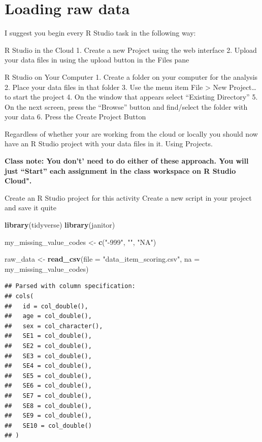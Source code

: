 \documentclass[
]{krantz}
\makeatletter
\newenvironment{Shaded}{\begin{snugshade}}{\end{snugshade}}
\newcommand{\DataTypeTok}[1]{\textcolor[rgb]{0.27,0.27,0.27}{#1}}
\newcommand{\KeywordTok}[1]{\textcolor[rgb]{0.27,0.27,0.27}{\textbf{#1}}}
\newcommand{\NormalTok}[1]{#1}
\newcommand{\StringTok}[1]{\textcolor[rgb]{0.5,0.5,0.5}{#1}}
\newenvironment{kframe}{%
\medskip{}
\setlength{\fboxsep}{.8em}
 \def\at@end@of@kframe{}%
 \ifinner\ifhmode%
  \def\at@end@of@kframe{\end{minipage}}%
  \begin{minipage}{\columnwidth}%
 \fi\fi%
 \def\FrameCommand##1{\hskip\@totalleftmargin \hskip-\fboxsep
 \colorbox{shadecolor}{##1}\hskip-\fboxsep
     \hskip-\linewidth \hskip-\@totalleftmargin \hskip\columnwidth}%
 \MakeFramed {\advance\hsize-\width
   \@totalleftmargin\z@ \linewidth\hsize
   \@setminipage}}%
 {\par\unskip\endMakeFramed%
 \at@end@of@kframe}
\renewenvironment{Shaded}{\begin{kframe}}{\end{kframe}}
\makeatother
\begin{document}
\hypertarget{loading-raw-data}{%
\section{Loading raw data}\label{loading-raw-data}}

I suggest you begin every R Studio task in the following way:

R Studio in the Cloud
1. Create a new Project using the web interface
2. Upload your data files in using the upload button in the Files pane

R Studio on Your Computer
1. Create a folder on your computer for the analysis
2. Place your data files in that folder
3. Use the menu item File \textgreater{} New Project\ldots{} to start the project
4. On the window that appears select ``Existing Directory''
5. On the next screen, press the ``Browse'' button and find/select the folder with your data
6. Press the Create Project Button

Regardless of whether your are working from the cloud or locally you should now have an R Studio project with your data files in it. Using Projects.

\textbf{Class note: You don't' need to do either of these approach. You will just ``Start'' each assignment in the class workspace on R Studio Cloud".}

Create an R Studio project for this activity
Create a new script in your project and save it quite

\begin{Shaded}
\begin{Highlighting}[]
\KeywordTok{library}\NormalTok{(tidyverse)}
\KeywordTok{library}\NormalTok{(janitor)}

\NormalTok{my_missing_value_codes <-}\StringTok{ }\KeywordTok{c}\NormalTok{(}\StringTok{"-999"}\NormalTok{, }\StringTok{""}\NormalTok{, }\StringTok{"NA"}\NormalTok{)}

\NormalTok{raw_data <-}\StringTok{ }\KeywordTok{read_csv}\NormalTok{(}\DataTypeTok{file =} \StringTok{"data_item_scoring.csv"}\NormalTok{,}
                     \DataTypeTok{na =}\NormalTok{ my_missing_value_codes)}
\end{Highlighting}
\end{Shaded}

\begin{verbatim}
## Parsed with column specification:
## cols(
##   id = col_double(),
##   age = col_double(),
##   sex = col_character(),
##   SE1 = col_double(),
##   SE2 = col_double(),
##   SE3 = col_double(),
##   SE4 = col_double(),
##   SE5 = col_double(),
##   SE6 = col_double(),
##   SE7 = col_double(),
##   SE8 = col_double(),
##   SE9 = col_double(),
##   SE10 = col_double()
## )
\end{verbatim}
\end{document}
